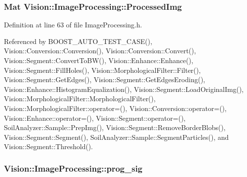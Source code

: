 \hypertarget{class_vision_1_1_image_processing_aa7d65742882cd1b2a1e4e9cb68809211}{}
\subsubsection[{Processed\+Img}]{\setlength{\rightskip}{0pt plus 5cm}Mat Vision\+::\+Image\+Processing\+::\+Processed\+Img}\label{class_vision_1_1_image_processing_aa7d65742882cd1b2a1e4e9cb68809211}


Definition at line 63 of file Image\+Processing.\+h.



Referenced by B\+O\+O\+S\+T\+\_\+\+A\+U\+T\+O\+\_\+\+T\+E\+S\+T\+\_\+\+C\+A\+S\+E(), Vision\+::\+Conversion\+::\+Conversion(), Vision\+::\+Conversion\+::\+Convert(), Vision\+::\+Segment\+::\+Convert\+To\+B\+W(), Vision\+::\+Enhance\+::\+Enhance(), Vision\+::\+Segment\+::\+Fill\+Holes(), Vision\+::\+Morphological\+Filter\+::\+Filter(), Vision\+::\+Segment\+::\+Get\+Edges(), Vision\+::\+Segment\+::\+Get\+Edges\+Eroding(), Vision\+::\+Enhance\+::\+Histogram\+Equalization(), Vision\+::\+Segment\+::\+Load\+Original\+Img(), Vision\+::\+Morphological\+Filter\+::\+Morphological\+Filter(), Vision\+::\+Morphological\+Filter\+::operator=(), Vision\+::\+Conversion\+::operator=(), Vision\+::\+Enhance\+::operator=(), Vision\+::\+Segment\+::operator=(), Soil\+Analyzer\+::\+Sample\+::\+Prep\+Img(), Vision\+::\+Segment\+::\+Remove\+Border\+Blobs(), Vision\+::\+Segment\+::\+Segment(), Soil\+Analyzer\+::\+Sample\+::\+Segment\+Particles(), and Vision\+::\+Segment\+::\+Threshold().

\hypertarget{class_vision_1_1_image_processing_ac0c168e16365ff5941791f67ec895663}{}
\subsubsection[{prog\+\_\+sig}]{ Vision\+::\+Image\+Processing\+::prog\+\_\+sig\hspace{0.3cm}{\ttfamily [protected]}}\label{class_vision_1_1_image_processing_ac0c168e16365ff5941791f67ec895663}


